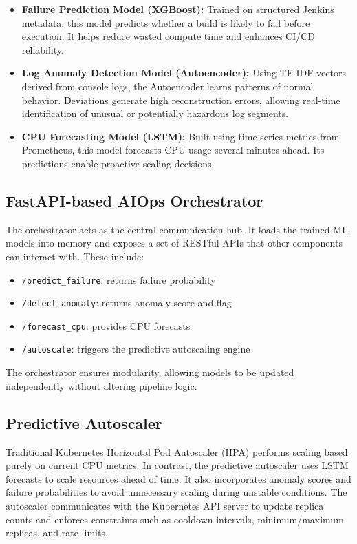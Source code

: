 \documentclass[a4paper,14pt,onecolumn]{report}
\begin{document}
\begin{itemize}
    \item \textbf{Failure Prediction Model (XGBoost):} Trained on structured Jenkins metadata, this model predicts whether a build is likely to fail before execution. It helps reduce wasted compute time and enhances CI/CD reliability.
    \item \textbf{Log Anomaly Detection Model (Autoencoder):} Using TF-IDF vectors derived from console logs, the Autoencoder learns patterns of normal behavior. Deviations generate high reconstruction errors, allowing real-time identification of unusual or potentially hazardous log segments.
    \item \textbf{CPU Forecasting Model (LSTM):} Built using time-series metrics from Prometheus, this model forecasts CPU usage several minutes ahead. Its predictions enable proactive scaling decisions.
\end{itemize}

\subsection{FastAPI-based AIOps Orchestrator}
The orchestrator acts as the central communication hub. It loads the trained ML models into memory and exposes a set of RESTful APIs that other components can interact with. These include:

\begin{itemize}
    \item \texttt{/predict\_failure}: returns failure probability
    \item \texttt{/detect\_anomaly}: returns anomaly score and flag
    \item \texttt{/forecast\_cpu}: provides CPU forecasts
    \item \texttt{/autoscale}: triggers the predictive autoscaling engine
\end{itemize}

The orchestrator ensures modularity, allowing models to be updated independently without altering pipeline logic.

\subsection{Predictive Autoscaler}
Traditional Kubernetes Horizontal Pod Autoscaler (HPA) performs scaling based purely on current CPU metrics. In contrast, the predictive autoscaler uses LSTM forecasts to scale resources ahead of time. It also incorporates anomaly scores and failure probabilities to avoid unnecessary scaling during unstable conditions. The autoscaler communicates with the Kubernetes API server to update replica counts and enforces constraints such as cooldown intervals, minimum/maximum replicas, and rate limits.
\end{document}
